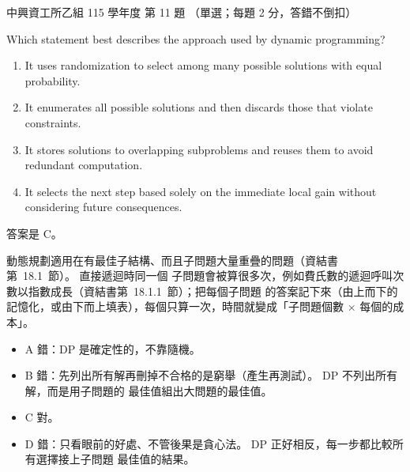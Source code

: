 \begin{pastexam}[label={px:nchu-115-is-11}]{中興資工所乙組 115 學年度 第 11 題}
（單選；每題 2 分，答錯不倒扣）

Which statement best describes the approach used by dynamic programming?
\begin{enumerate}[label=\Alph*.,nosep]
\item It uses randomization to select among many possible solutions with equal probability.
\item It enumerates all possible solutions and then discards those that violate constraints.
\item It stores solutions to overlapping subproblems and reuses them to avoid redundant
computation.
\item It selects the next step based solely on the immediate local gain without considering
future consequences.
\end{enumerate}
\end{pastexam}

\begin{pastsoln}
答案是 C。

動態規劃適用在有最佳子結構、而且子問題大量重疊的問題（資結書第~18.1~節）。 直接遞迴時同一個
子問題會被算很多次，例如費氏數的遞迴呼叫次數以指數成長（資結書第~18.1.1~節）；把每個子問題
的答案記下來（由上而下的記憶化，或由下而上填表），每個只算一次，時間就變成「子問題個數 $\times$
每個的成本」。
\begin{itemize}
\item A 錯：DP 是確定性的，不靠隨機。
\item B 錯：先列出所有解再刪掉不合格的是窮舉（產生再測試）。 DP 不列出所有解，而是用子問題的
最佳值組出大問題的最佳值。
\item C 對。
\item D 錯：只看眼前的好處、不管後果是貪心法。 DP 正好相反，每一步都比較所有選擇接上子問題
最佳值的結果。
\end{itemize}
\end{pastsoln}
